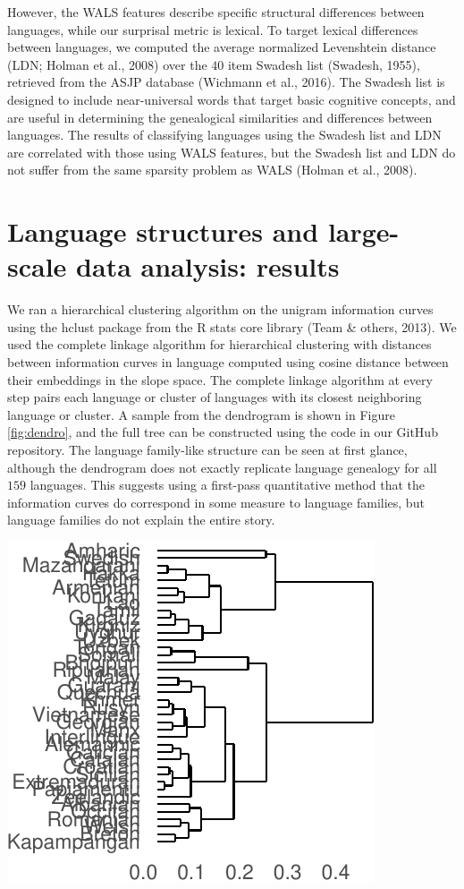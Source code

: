 \documentclass[man,floatsintext]{apa6}
\begin{document}
However, the WALS features describe specific structural differences between languages, while our surprisal metric is lexical. To target lexical differences between languages, we computed the average normalized Levenshtein distance (LDN; Holman et al., 2008) over the \(40\) item Swadesh list (Swadesh, 1955), retrieved from the ASJP database (Wichmann et al., 2016). The Swadesh list is designed to include near-universal words that target basic cognitive concepts, and are useful in determining the genealogical similarities and differences between languages. The results of classifying languages using the Swadesh list and LDN are correlated with those using WALS features, but the Swadesh list and LDN do not suffer from the same sparsity problem as WALS (Holman et al., 2008).

\hypertarget{language-structures-and-large-scale-data-analysis-results}{%
\section{Language structures and large-scale data analysis: results}\label{language-structures-and-large-scale-data-analysis-results}}

We ran a hierarchical clustering algorithm on the unigram information curves using the hclust package from the R stats core library (Team \& others, 2013). We used the complete linkage algorithm for hierarchical clustering with distances between information curves in language computed using cosine distance between their embeddings in the slope space. The complete linkage algorithm at every step pairs each language or cluster of languages with its closest neighboring language or cluster. A sample from the dendrogram is shown in Figure \ref{fig:dendro}, and the full tree can be constructed using the code in our GitHub repository. The language family-like structure can be seen at first glance, although the dendrogram does not exactly replicate language genealogy for all \(159\) languages. This suggests using a first-pass quantitative method that the information curves do correspond in some measure to language families, but language families do not explain the entire story.

\includegraphics{figs/dendro-1.pdf}
\end{document}
